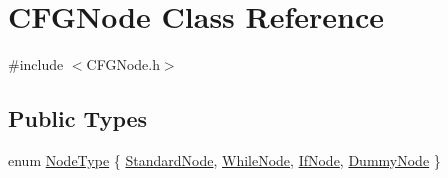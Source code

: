\hypertarget{class_c_f_g_node}{\section{C\-F\-G\-Node Class Reference}
\label{class_c_f_g_node}
}


{\ttfamily \#include $<$C\-F\-G\-Node.\-h$>$}

\subsection*{Public Types}
\begin{DoxyCompactItemize}
\item 
enum \hyperlink{class_c_f_g_node_aa0933713506a9c0226e705703ee5b079}{Node\-Type} \{ \hyperlink{class_c_f_g_node_aa0933713506a9c0226e705703ee5b079aa2e8603898955894b9dee1c4357f7438}{Standard\-Node}, 
\hyperlink{class_c_f_g_node_aa0933713506a9c0226e705703ee5b079ade6fc811a65caa8511c48b93134a90e7}{While\-Node}, 
\hyperlink{class_c_f_g_node_aa0933713506a9c0226e705703ee5b079a12589e59a33dfed127168c3663a6e52e}{If\-Node}, 
\hyperlink{class_c_f_g_node_aa0933713506a9c0226e705703ee5b079a653298400dbc11a4a806566fc8da20d3}{Dummy\-Node}
 \}
\end{DoxyCompactItemize}
